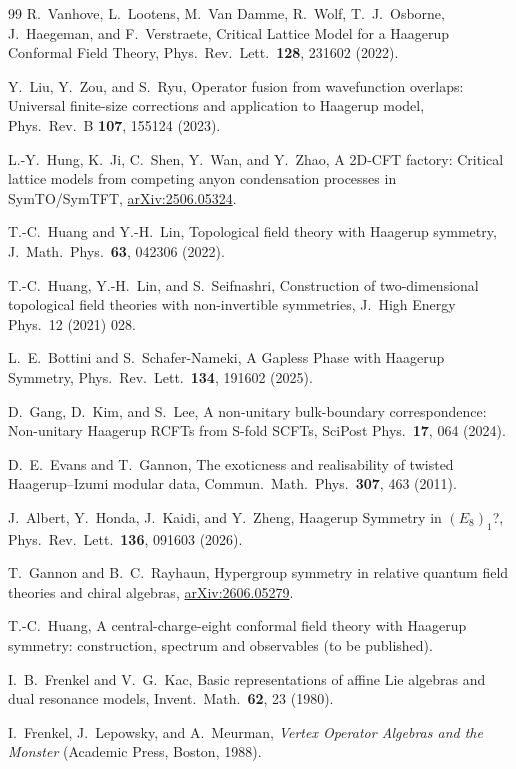 \documentclass[aps,prl,twocolumn,superscriptaddress,nofootinbib]{revtex4-2}
\begin{document}
\begin{thebibliography}{99}
R.~Vanhove, L.~Lootens, M.~Van Damme, R.~Wolf, T.~J.~Osborne,
J.~Haegeman, and F.~Verstraete,
Critical Lattice Model for a Haagerup Conformal Field Theory,
Phys.\ Rev.\ Lett.\ \textbf{128}, 231602 (2022).

Y.~Liu, Y.~Zou, and S.~Ryu,
Operator fusion from wavefunction overlaps: Universal finite-size
corrections and application to Haagerup model,
Phys.\ Rev.\ B \textbf{107}, 155124 (2023).

L.-Y.~Hung, K.~Ji, C.~Shen, Y.~Wan, and Y.~Zhao,
A 2D-CFT factory: Critical lattice models from competing anyon
condensation processes in SymTO/SymTFT,
\href{https://arxiv.org/abs/2506.05324}{arXiv:2506.05324}.

T.-C.~Huang and Y.-H.~Lin,
Topological field theory with Haagerup symmetry,
J.\ Math.\ Phys.\ \textbf{63}, 042306 (2022).

T.-C.~Huang, Y.-H.~Lin, and S.~Seifnashri,
Construction of two-dimensional topological field theories with
non-invertible symmetries,
J.\ High Energy Phys.\ 12 (2021) 028.

L.~E.~Bottini and S.~Schafer-Nameki,
A Gapless Phase with Haagerup Symmetry,
Phys.\ Rev.\ Lett.\ \textbf{134}, 191602 (2025).

D.~Gang, D.~Kim, and S.~Lee,
A non-unitary bulk-boundary correspondence: Non-unitary Haagerup RCFTs
from S-fold SCFTs,
SciPost Phys.\ \textbf{17}, 064 (2024).

D.~E.~Evans and T.~Gannon,
The exoticness and realisability of twisted Haagerup--Izumi modular
data,
Commun.\ Math.\ Phys.\ \textbf{307}, 463 (2011).

J.~Albert, Y.~Honda, J.~Kaidi, and Y.~Zheng,
Haagerup Symmetry in $(E_8)_1$?,
Phys.\ Rev.\ Lett.\ \textbf{136}, 091603 (2026).

T.~Gannon and B.~C.~Rayhaun,
Hypergroup symmetry in relative quantum field theories and chiral
algebras,
\href{https://arxiv.org/abs/2606.05279}{arXiv:2606.05279}.

T.-C.~Huang, A central-charge-eight conformal field theory with
Haagerup symmetry: construction, spectrum and observables (to be
published).

I.~B.~Frenkel and V.~G.~Kac,
Basic representations of affine Lie algebras and dual resonance models,
Invent.\ Math.\ \textbf{62}, 23 (1980).

I.~Frenkel, J.~Lepowsky, and A.~Meurman,
\textit{Vertex Operator Algebras and the Monster}
(Academic Press, Boston, 1988).


\end{thebibliography}
\end{document}
